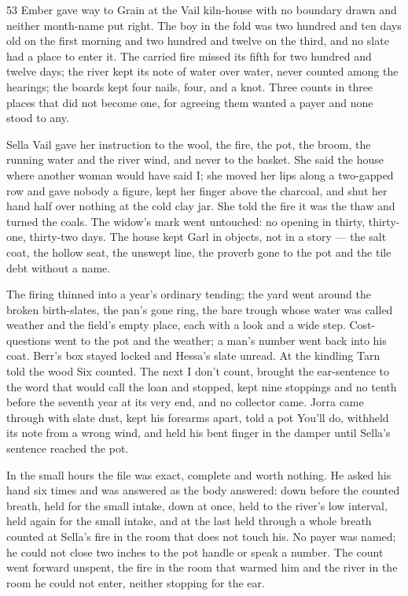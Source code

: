 \begin{CRchronicle}{53}
Ember gave way to Grain at the Vail kiln-house with no boundary drawn and neither month-name put right. The boy in the fold was two hundred and ten days old on the first morning and two hundred and twelve on the third, and no slate had a place to enter it. The carried fire missed its fifth for two hundred and twelve days; the river kept its note of water over water, never counted among the hearings; the boards kept four nails, four, and a knot. Three counts in three places that did not become one, for agreeing them wanted a payer and none stood to any.

Sella Vail gave her instruction to the wool, the fire, the pot, the broom, the running water and the river wind, and never to the basket. She said the house where another woman would have said I; she moved her lips along a two-gapped row and gave nobody a figure, kept her finger above the charcoal, and shut her hand half over nothing at the cold clay jar. She told the fire it was the thaw and turned the coals. The widow’s mark went untouched: no opening in thirty, thirty-one, thirty-two days. The house kept Garl in objects, not in a story --- the salt coat, the hollow seat, the unswept line, the proverb gone to the pot and the tile debt without a name.

The firing thinned into a year’s ordinary tending; the yard went around the broken birth-slates, the pan’s gone ring, the bare trough whose water was called weather and the field’s empty place, each with a look and a wide step. Cost-questions went to the pot and the weather; a man’s number went back into his coat. Berr’s box stayed locked and Hessa’s slate unread. At the kindling Tarn told the wood Six counted. The next I don’t count, brought the ear-sentence to the word that would call the loan and stopped, kept nine stoppings and no tenth before the seventh year at its very end, and no collector came. Jorra came through with slate dust, kept his forearms apart, told a pot You’ll do, withheld its note from a wrong wind, and held his bent finger in the damper until Sella’s sentence reached the pot.

In the small hours the file was exact, complete and worth nothing. He asked his hand six times and was answered as the body answered: down before the counted breath, held for the small intake, down at once, held to the river’s low interval, held again for the small intake, and at the last held through a whole breath counted at Sella’s fire in the room that does not touch his. No payer was named; he could not close two inches to the pot handle or speak a number. The count went forward unspent, the fire in the room that warmed him and the river in the room he could not enter, neither stopping for the ear.
\end{CRchronicle}
